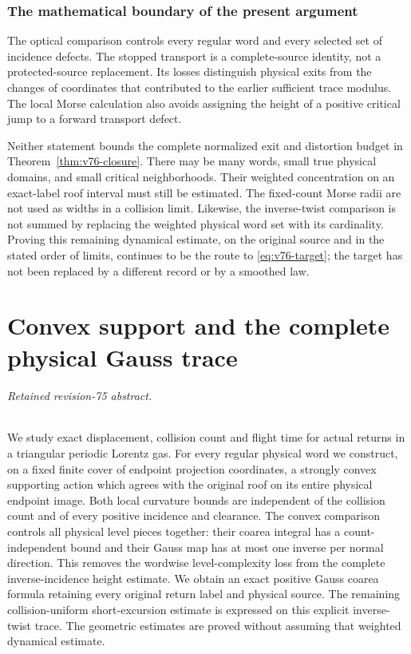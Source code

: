 \documentclass[11pt,reqno]{amsart}
\numberwithin{equation}{section}
\theoremstyle{definition}\newtheorem{definition}[theorem]{Definition}
\theoremstyle{remark}\newtheorem{remark}[theorem]{Remark}
\theoremstyle{definition}\newtheorem{inputstatement}[theorem]{Input statement}
\begin{document}




\section{The mathematical boundary of the present argument}
The optical comparison controls every regular word and every selected
set of incidence defects. The stopped transport is a complete-source
identity, not a protected-source replacement. Its losses distinguish
physical exits from the changes of coordinates that contributed to
the earlier sufficient trace modulus. The local Morse calculation
also avoids assigning the height of a positive critical jump to a
forward transport defect.

Neither statement bounds the complete normalized exit and distortion
budget in Theorem~\ref{thm:v76-closure}. There may be many words,
small true physical domains, and small critical neighborhoods. Their
weighted concentration on an exact-label roof interval must still be
estimated. The fixed-count Morse radii are not used as widths in a
collision limit. Likewise, the inverse-twist comparison is not summed
by replacing the weighted physical word set with its cardinality.
Proving this remaining dynamical estimate, on the original source
and in the stated order of limits, continues to be the route to
\eqref{eq:v76-target}; the target has not been replaced by a different
record or by a smoothed law.


\part{Convex support and the complete physical Gauss trace}
\paragraph{Retained revision-75 abstract.}

We study exact displacement, collision count and flight time for actual
returns in a triangular periodic Lorentz gas. For every regular physical
word we construct, on a fixed finite cover of endpoint projection
coordinates, a strongly convex supporting action which agrees with the
original roof on its entire physical endpoint image. Both local curvature
bounds are independent of the collision count and of every positive
incidence and clearance. The convex comparison controls all physical
level pieces together: their coarea integral has a count-independent
bound and their Gauss map has at most one inverse per normal direction.
This removes the wordwise level-complexity loss from the complete
inverse-incidence height estimate. We obtain an exact positive Gauss
coarea formula retaining every original return label and physical source.
The remaining collision-uniform short-excursion estimate is expressed
on this explicit inverse-twist trace. The geometric estimates are proved
without assuming that weighted dynamical estimate.
\end{document}
